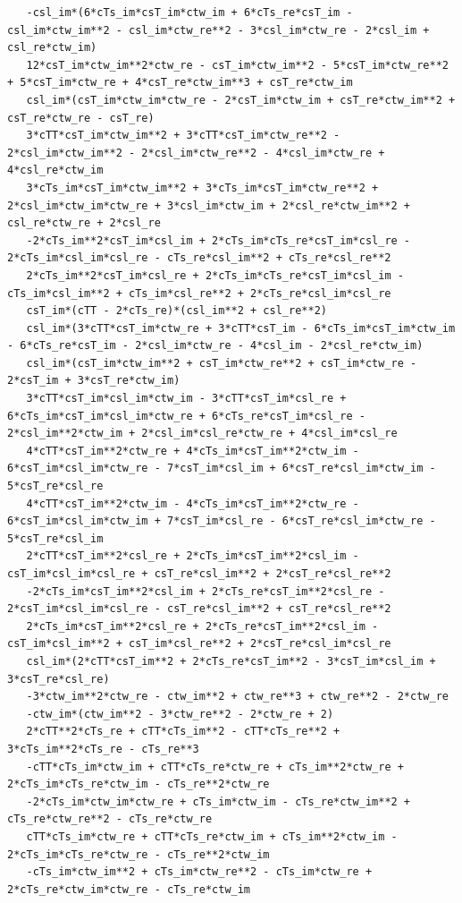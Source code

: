 \documentclass[
  10pt,
]{article}
\begin{document}
\begin{verbatim}
   -csl_im*(6*cTs_im*csT_im*ctw_im + 6*cTs_re*csT_im - csl_im*ctw_im**2 - csl_im*ctw_re**2 - 3*csl_im*ctw_re - 2*csl_im + csl_re*ctw_im)
   12*csT_im*ctw_im**2*ctw_re - csT_im*ctw_im**2 - 5*csT_im*ctw_re**2 + 5*csT_im*ctw_re + 4*csT_re*ctw_im**3 + csT_re*ctw_im
   csl_im*(csT_im*ctw_im*ctw_re - 2*csT_im*ctw_im + csT_re*ctw_im**2 + csT_re*ctw_re - csT_re)
   3*cTT*csT_im*ctw_im**2 + 3*cTT*csT_im*ctw_re**2 - 2*csl_im*ctw_im**2 - 2*csl_im*ctw_re**2 - 4*csl_im*ctw_re + 4*csl_re*ctw_im
   3*cTs_im*csT_im*ctw_im**2 + 3*cTs_im*csT_im*ctw_re**2 + 2*csl_im*ctw_im*ctw_re + 3*csl_im*ctw_im + 2*csl_re*ctw_im**2 + csl_re*ctw_re + 2*csl_re
   -2*cTs_im**2*csT_im*csl_im + 2*cTs_im*cTs_re*csT_im*csl_re - 2*cTs_im*csl_im*csl_re - cTs_re*csl_im**2 + cTs_re*csl_re**2
   2*cTs_im**2*csT_im*csl_re + 2*cTs_im*cTs_re*csT_im*csl_im - cTs_im*csl_im**2 + cTs_im*csl_re**2 + 2*cTs_re*csl_im*csl_re
   csT_im*(cTT - 2*cTs_re)*(csl_im**2 + csl_re**2)
   csl_im*(3*cTT*csT_im*ctw_re + 3*cTT*csT_im - 6*cTs_im*csT_im*ctw_im - 6*cTs_re*csT_im - 2*csl_im*ctw_re - 4*csl_im - 2*csl_re*ctw_im)
   csl_im*(csT_im*ctw_im**2 + csT_im*ctw_re**2 + csT_im*ctw_re - 2*csT_im + 3*csT_re*ctw_im)
   3*cTT*csT_im*csl_im*ctw_im - 3*cTT*csT_im*csl_re + 6*cTs_im*csT_im*csl_im*ctw_re + 6*cTs_re*csT_im*csl_re - 2*csl_im**2*ctw_im + 2*csl_im*csl_re*ctw_re + 4*csl_im*csl_re
   4*cTT*csT_im**2*ctw_re + 4*cTs_im*csT_im**2*ctw_im - 6*csT_im*csl_im*ctw_re - 7*csT_im*csl_im + 6*csT_re*csl_im*ctw_im - 5*csT_re*csl_re
   4*cTT*csT_im**2*ctw_im - 4*cTs_im*csT_im**2*ctw_re - 6*csT_im*csl_im*ctw_im + 7*csT_im*csl_re - 6*csT_re*csl_im*ctw_re - 5*csT_re*csl_im
   2*cTT*csT_im**2*csl_re + 2*cTs_im*csT_im**2*csl_im - csT_im*csl_im*csl_re + csT_re*csl_im**2 + 2*csT_re*csl_re**2
   -2*cTs_im*csT_im**2*csl_im + 2*cTs_re*csT_im**2*csl_re - 2*csT_im*csl_im*csl_re - csT_re*csl_im**2 + csT_re*csl_re**2
   2*cTs_im*csT_im**2*csl_re + 2*cTs_re*csT_im**2*csl_im - csT_im*csl_im**2 + csT_im*csl_re**2 + 2*csT_re*csl_im*csl_re
   csl_im*(2*cTT*csT_im**2 + 2*cTs_re*csT_im**2 - 3*csT_im*csl_im + 3*csT_re*csl_re)
   -3*ctw_im**2*ctw_re - ctw_im**2 + ctw_re**3 + ctw_re**2 - 2*ctw_re
   -ctw_im*(ctw_im**2 - 3*ctw_re**2 - 2*ctw_re + 2)
   2*cTT**2*cTs_re + cTT*cTs_im**2 - cTT*cTs_re**2 + 3*cTs_im**2*cTs_re - cTs_re**3
   -cTT*cTs_im*ctw_im + cTT*cTs_re*ctw_re + cTs_im**2*ctw_re + 2*cTs_im*cTs_re*ctw_im - cTs_re**2*ctw_re
   -2*cTs_im*ctw_im*ctw_re + cTs_im*ctw_im - cTs_re*ctw_im**2 + cTs_re*ctw_re**2 - cTs_re*ctw_re
   cTT*cTs_im*ctw_re + cTT*cTs_re*ctw_im + cTs_im**2*ctw_im - 2*cTs_im*cTs_re*ctw_re - cTs_re**2*ctw_im
   -cTs_im*ctw_im**2 + cTs_im*ctw_re**2 - cTs_im*ctw_re + 2*cTs_re*ctw_im*ctw_re - cTs_re*ctw_im

\end{verbatim}
\end{document}
